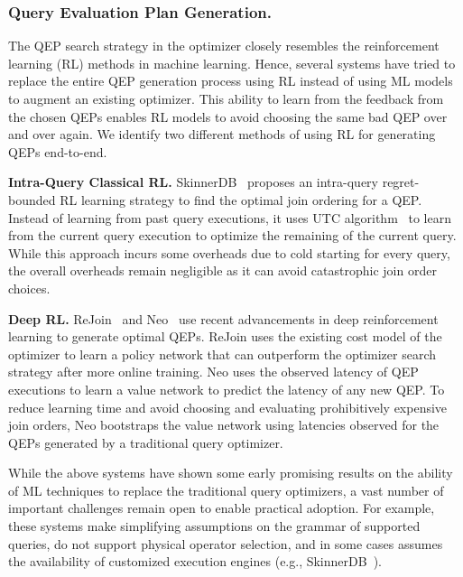 \subsubsection{Query Evaluation Plan Generation.} The QEP search strategy in the optimizer closely resembles the reinforcement learning (RL) methods in machine learning.
Hence, several systems have tried to replace the entire QEP generation process using RL instead of using ML models to augment an existing optimizer.
This ability to learn from the feedback from the chosen QEPs enables RL models to avoid choosing the same bad QEP over and over again.
We identify two different methods of using RL for generating QEPs end-to-end.

\vspace{2mm}
\noindent \textbf{Intra-Query Classical RL.} SkinnerDB~\cite{skinnerdb} proposes an intra-query regret-bounded RL learning strategy to find the optimal join ordering for a QEP.
Instead of learning from past query executions, it uses UTC algorithm~\cite{utc} to learn from the current query execution to optimize the remaining of the current query.
While this approach incurs some overheads due to cold starting for every query, the overall overheads remain negligible as it can avoid catastrophic join order choices.

\vspace{2mm}
\noindent \textbf{Deep RL.} ReJoin~\cite{rejoin} and Neo~\cite{neo} use recent advancements in deep reinforcement learning to generate optimal QEPs.
ReJoin uses the existing cost model of the optimizer to learn a policy network that can outperform the optimizer search strategy after more online training.
Neo uses the observed latency of QEP executions to learn a value network to predict the latency of any new QEP.
To reduce learning time and avoid choosing and evaluating prohibitively expensive join orders, Neo bootstraps the value network using latencies observed for the QEPs generated by a traditional query optimizer.

\vspace{2mm}
While the above systems have shown some early promising results on the ability of ML techniques to replace the traditional query optimizers, a vast number of important challenges remain open to enable practical adoption.
For example, these systems make simplifying assumptions on the grammar of supported queries, do not support physical operator selection, and in some cases assumes the availability of customized execution engines (e.g., SkinnerDB~\cite{skinnerdb}).


